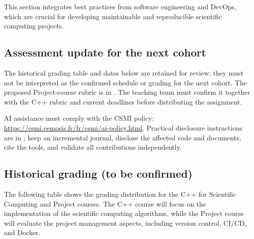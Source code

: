 \documentclass[11pt,a4paper]{article}
\begin{document}
This section integrates best practices from software engineering and DevOps, which are crucial for developing maintainable and reproducible scientific computing projects.

\subsection{Assessment update for the next cohort}

The historical grading table and dates below are retained for review; they must not be interpreted as the confirmed schedule or grading for the next cohort.
The proposed Project-course rubric is in . The teaching team must confirm it together with the C++ rubric and current deadlines before distributing the assignment.

AI assistance must comply with the CSMI policy:
\url{https://csmi.cemosis.fr/fr/csmi/ai-policy.html}.
Practical disclosure instructions are in ; keep an incremental journal, disclose the affected code and documents, cite the tools, and validate all contributions independently.

\subsection{Historical grading (to be confirmed)}

The following table shows the grading distribution for the C++ for Scientific Computing and Project courses. 
The C++ course will focus on the implementation of the scientific computing algorithms, while the Project course will evaluate the project management aspects, including version control, CI/CD, and Docker.
\end{document}
